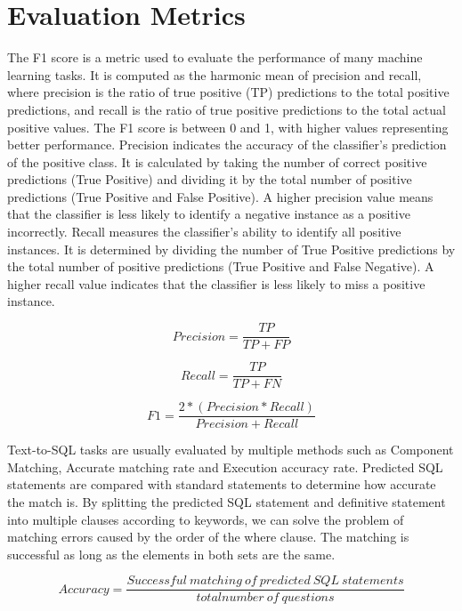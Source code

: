 \section{Evaluation Metrics} \label{eval}

The F1 score is a metric used to evaluate the performance of many machine learning tasks. It is computed as the harmonic mean of precision and recall, where precision is the ratio of true positive (TP) predictions to the total positive predictions, and recall is the ratio of true positive predictions to the total actual positive values. The F1 score is between 0 and 1, with higher values representing better performance.
Precision indicates the accuracy of the classifier's prediction of the positive class. It is calculated by taking the number of correct positive predictions (True Positive) and dividing it by the total number of positive predictions (True Positive and False Positive). A higher precision value means that the classifier is less likely to identify a negative instance as a positive incorrectly.
Recall measures the classifier's ability to identify all positive instances. It is determined by dividing the number of True Positive predictions by the total number of positive predictions (True Positive and False Negative). A higher recall value indicates that the classifier is less likely to miss a positive instance.

\begin{equation}
    Precision = \frac{TP}{TP + FP}
\end{equation}

\begin{equation}
    Recall = \frac{TP}{TP + FN}
\end{equation}

\begin{equation}
    F1 = \frac{2 * (Precision * Recall)}{Precision + Recall}
\end{equation}

Text-to-SQL tasks are usually evaluated by multiple methods such as Component Matching, Accurate matching rate and Execution accuracy rate. Predicted SQL statements are compared with standard statements to determine how accurate the match is.
By splitting the predicted SQL statement and definitive statement into multiple clauses according to keywords, we can solve the problem of matching errors caused by the order of the where clause. The matching is successful as long as the elements in both sets are the same.

\begin{equation}
    Accuracy = \frac{Successful\ matching\ of\ predicted\ SQL\ statements}{total number\ of\ questions}
    \label{fig:acc1}
\end{equation}

